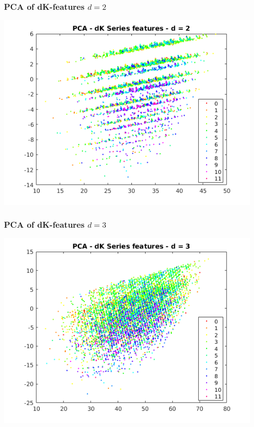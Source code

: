 \documentclass{beamer}
\begin{document}
\begin{frame}
\frametitle{PCA of dK-features $d = 2$}
\begin{justify}
\begin{center}
	\includegraphics[scale=0.5]{d2-PCA}
\end{center}
\end{justify}
\end{frame}

\begin{frame}
\frametitle{PCA of dK-features $d = 3$}
\begin{justify}
\begin{center}
	\includegraphics[scale=0.5]{d3-PCA}
\end{center}
\end{justify}
\end{frame}
\end{document}
